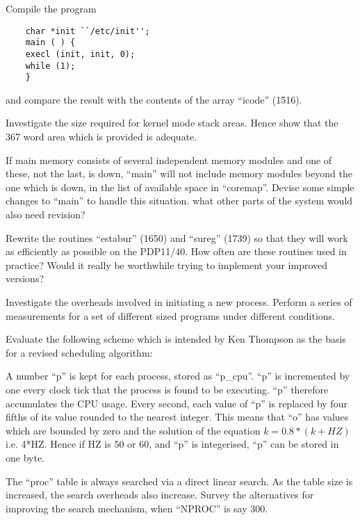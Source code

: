 \item[1.7] Compile the program

\begin{verbatim}
    char *init ``/etc/init'';
    main ( ) {
    execl (init, init, 0);
    while (1);
    }
\end{verbatim}

and compare the result with the contents of the array ``icode'' (1516).

\item[1.8] Investigate the size required for
kernel mode stack areas. Hence show
that the 367 word area which is provided is adequate.

\item[1.9] If main memory consists of several
independent memory modules and one of
these, not the last, is down, ``main''
will not include memory modules beyond
the one which is down, in the list of
available space in ``coremap''. Devise
some simple changes to ``main'' to handle
this situation. what other parts of the
system would also need revision?

\item[1.10] Rewrite the routines ``estabur''
(1650) and ``sureg'' (1739) so that they
will work as efficiently as possible on
the PDP11/40. How often are these routines used in practice? Would it really
be worthwhile trying to implement your
improved versions?

\item[1.11] Investigate the overheads involved
in initiating a new process. Perform a
series of measurements for a set of
different sized programs under different conditions.

\item[1.12] Evaluate the following scheme
which is intended by Ken Thompson as
the basis for a revised scheduling
algorithm:

A number ``p'' is kept for each process, stored as ``p\_cpu''.
``p'' is incremented by one every clock tick that the
process is found to be executing. ``p''
therefore accumulates the CPU usage.
Every second, each value of ``p'' is
replaced by four fifths of its value
rounded to the nearest integer. This
means that ``o'' has values which are
bounded by zero and the solution of the
equation  $k = 0.8*(k + HZ)$ i.e.
4*HZ. Hence if HZ is 50 or 60, and ``p''
is integerised, ``p'' can be stored in
one byte.

\item[1.13] The ``proc'' table is always
searched via a direct linear search. As
the table size is increased, the search
overheads also increase. Survey the
alternatives for improving the search
mechanism, when ``NPROC'' is say 300.
\ed

